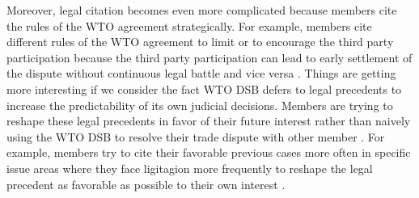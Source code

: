 Moreover, legal citation becomes even more complicated because members cite the
rules of the WTO agreement strategically. For example,
members cite different rules of the WTO agreement to limit or to encourage
the third party participation because the third party
participation can lead to early settlement of the dispute without continuous
legal battle and vice versa  \cite{who_gets}. Things are getting more interesting if we consider the fact WTO DSB defers to legal precedents to increase the predictability of its own judicial decisions.
Members are trying to reshape these legal precedents in favor of their future interest rather than naively using the WTO DSB to resolve their trade dispute with other member \citep{pelc}.
For example, members try to cite their favorable previous cases more often in specific issue areas where they face ligitagion more frequently to reshape the legal precedent as favorable as possible to their own interest \citep{latent}.

